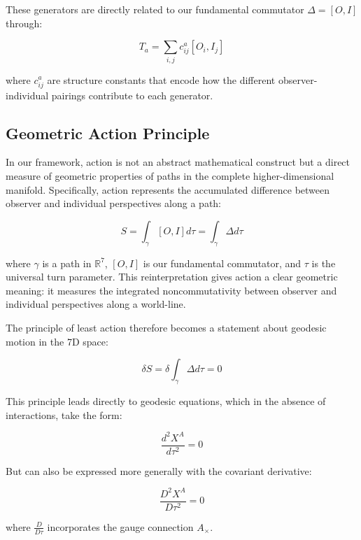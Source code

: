\documentclass{article}
\begin{document}
These generators are directly related to our fundamental commutator $\Delta = [O, I]$ through:

\begin{equation}
T_a = \sum_{i,j} c^a_{ij}[O_i, I_j]
\end{equation}

where $c^a_{ij}$ are structure constants that encode how the different observer-individual pairings contribute to each generator.

\subsection{Geometric Action Principle}

In our framework, action is not an abstract mathematical construct but a direct measure of geometric properties of paths in the complete higher-dimensional manifold. Specifically, action represents the accumulated difference between observer and individual perspectives along a path:

\begin{equation}
S = \int_\gamma [O,I]d\tau = \int_\gamma \Delta d\tau
\end{equation}

where $\gamma$ is a path in $\mathbb{R}^7$, $[O,I]$ is our fundamental commutator, and $\tau$ is the universal turn parameter. This reinterpretation gives action a clear geometric meaning: it measures the integrated noncommutativity between observer and individual perspectives along a world-line.

The principle of least action therefore becomes a statement about geodesic motion in the 7D space:

\begin{equation}
\delta S = \delta \int_\gamma \Delta d\tau = 0
\end{equation}

This principle leads directly to geodesic equations, which in the absence of interactions, take the form:

\begin{equation}
\frac{d^2 X^A}{d\tau^2} = 0
\end{equation}

But can also be expressed more generally with the covariant derivative:

\begin{equation}
\frac{D^2 X^A}{D\tau^2} = 0
\end{equation}

where $\frac{D}{D\tau}$ incorporates the gauge connection $A_\times$.
\end{document}
